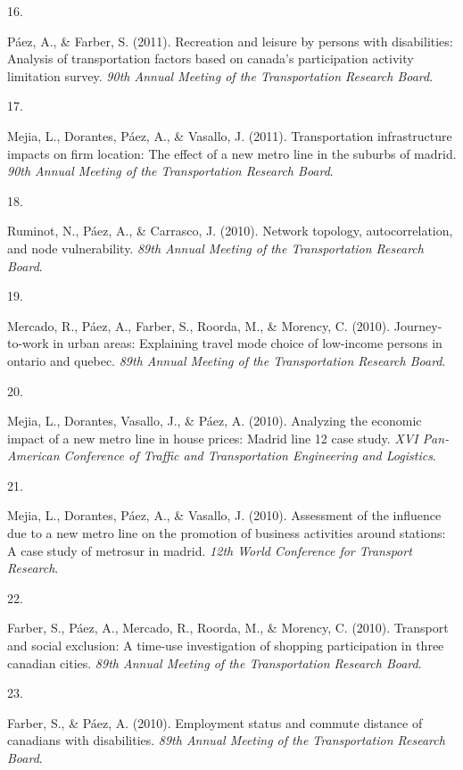 \documentclass[11pt,a4paper,]{awesome-cv}
\newlength{\cslhangindent}
\newlength{\csllabelwidth}
\newenvironment{CSLReferences}[2] %
 {\begin{list}{}{%
  \setlength{\itemindent}{0pt}
  \setlength{\leftmargin}{0pt}
  \setlength{\parsep}{0pt}
  \ifodd #1
   \setlength{\leftmargin}{\cslhangindent}
   \setlength{\itemindent}{-1\cslhangindent}
  \fi
  \setlength{\itemsep}{#2\baselineskip}}}
 {\end{list}}
\newcommand{\CSLLeftMargin}[1]{\parbox[t]{\csllabelwidth}{\strut#1\strut}}
\newcommand{\CSLRightInline}[1]{\parbox[t]{\linewidth - \csllabelwidth}{\strut#1\strut}}
\begin{document}
\begin{CSLReferences}{0}{0}
\CSLLeftMargin{16. }%
\CSLRightInline{Páez, A., \& Farber, S. (2011). Recreation and leisure
by persons with disabilities: Analysis of transportation factors based
on canada's participation activity limitation survey. \emph{90th Annual
Meeting of the Transportation Research Board}.}

\CSLLeftMargin{17. }%
\CSLRightInline{Mejia, L., Dorantes, Páez, A., \& Vasallo, J. (2011).
Transportation infrastructure impacts on firm location: The effect of a
new metro line in the suburbs of madrid. \emph{90th Annual Meeting of
the Transportation Research Board}.}

\CSLLeftMargin{18. }%
\CSLRightInline{Ruminot, N., Páez, A., \& Carrasco, J. (2010). Network
topology, autocorrelation, and node vulnerability. \emph{89th Annual
Meeting of the Transportation Research Board}.}

\CSLLeftMargin{19. }%
\CSLRightInline{Mercado, R., Páez, A., Farber, S., Roorda, M., \&
Morency, C. (2010). Journey-to-work in urban areas: Explaining travel
mode choice of low-income persons in ontario and quebec. \emph{89th
Annual Meeting of the Transportation Research Board}.}

\CSLLeftMargin{20. }%
\CSLRightInline{Mejia, L., Dorantes, Vasallo, J., \& Páez, A. (2010).
Analyzing the economic impact of a new metro line in house prices:
Madrid line 12 case study. \emph{XVI Pan-American Conference of Traffic
and Transportation Engineering and Logistics}.}

\CSLLeftMargin{21. }%
\CSLRightInline{Mejia, L., Dorantes, Páez, A., \& Vasallo, J. (2010).
Assessment of the influence due to a new metro line on the promotion of
business activities around stations: A case study of metrosur in madrid.
\emph{12th World Conference for Transport Research}.}

\CSLLeftMargin{22. }%
\CSLRightInline{Farber, S., Páez, A., Mercado, R., Roorda, M., \&
Morency, C. (2010). Transport and social exclusion: A time-use
investigation of shopping participation in three canadian cities.
\emph{89th Annual Meeting of the Transportation Research Board}.}

\CSLLeftMargin{23. }%
\CSLRightInline{Farber, S., \& Páez, A. (2010). Employment status and
commute distance of canadians with disabilities. \emph{89th Annual
Meeting of the Transportation Research Board}.}


\end{CSLReferences}
\end{document}
